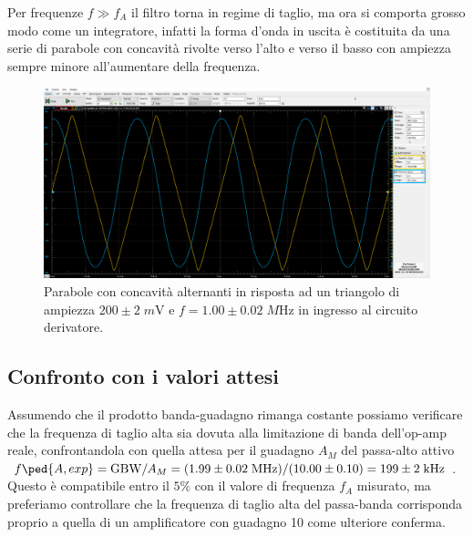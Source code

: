 \documentclass[10pt, a4paper, italian]{article}
\begin{document}
Per frequenze $f \gg f_A$ il filtro torna in regime di taglio, ma ora si
comporta grosso modo come un integratore, infatti la forma d'onda in uscita è
costituita da una serie di parabole con concavità rivolte verso l'alto e verso
il basso con ampiezza sempre minore all'aumentare della frequenza.
\begin{figure}[htbp]
\centering
\includegraphics[scale=0.335]{derpar}
\caption{Parabole con concavità alternanti in risposta ad un triangolo di
ampiezza $200 \pm 2 \; \si{m\V}$ e $f = 1.00 \pm 0.02 \; \si{M\Hz}$ in ingresso
al circuito derivatore. \label{fig: derpar}}
\end{figure}

\subsection{Confronto con i valori attesi}
Assumendo che il prodotto banda-guadagno rimanga costante possiamo verificare
che la frequenza di taglio alta sia dovuta alla limitazione di banda
dell'op-amp reale, confrontandola con quella attesa per il guadagno $A_M$ del
passa-alto attivo
$f\ped{A, exp} = \mathrm{GBW}/A_M
= (1.99 \pm 0.02 \; \si{M\Hz})/(10.00 \pm 0.10) = 199 \pm 2 \; \si{k\Hz}$.
Questo è compatibile entro il $5\%$ con il valore di frequenza $f_A$ misurato,
ma preferiamo controllare che la frequenza di taglio alta del passa-banda
corrisponda proprio a quella di un amplificatore con guadagno 10 come ulteriore
conferma.
\end{document}

